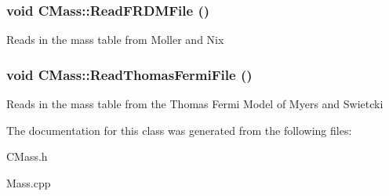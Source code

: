 \subsubsection{\setlength{\rightskip}{0pt plus 5cm}void CMass::Read\-FRDMFile ()\hspace{0.3cm}{\tt  [protected]}}\label{classCMass_95df5960907d3cde94a79ba1de582681}


Reads in the mass table from Moller and Nix 
\subsubsection{\setlength{\rightskip}{0pt plus 5cm}void CMass::Read\-Thomas\-Fermi\-File ()\hspace{0.3cm}{\tt  [protected]}}\label{classCMass_f1fa180e06c50061df38460b1116de82}


Reads in the mass table from the Thomas Fermi Model of Myers and Swietcki 

The documentation for this class was generated from the following files:\begin{CompactItemize}
\item 
CMass.h\item 
Mass.cpp\end{CompactItemize}
